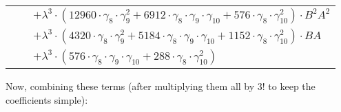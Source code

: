 \documentclass{article}
\begin{document}
\begin{table}[!hp]
\begin{center}
\begin{tabular}{rcl}
 & & $ + {\lambda}^3{\cdot}(12960{\cdot}{\gamma}_{8}{\cdot}{\gamma}_{9}^{2}+6912{\cdot}{\gamma}_{8}{\cdot}{\gamma}_{9}{\cdot}{\gamma}_{10}+576{\cdot}{\gamma}_{8}{\cdot}{\gamma}_{10}^{2}){\cdot}B^{2}A^{2}$ \\
 & & $ + {\lambda}^3{\cdot}(4320{\cdot}{\gamma}_{8}{\cdot}{\gamma}_{9}^{2}+5184{\cdot}{\gamma}_{8}{\cdot}{\gamma}_{9}{\cdot}{\gamma}_{10}+1152{\cdot}{\gamma}_{8}{\cdot}{\gamma}_{10}^{2}){\cdot}BA$ \\
 & & $ + {\lambda}^3{\cdot}(576{\cdot}{\gamma}_{8}{\cdot}{\gamma}_{9}{\cdot}{\gamma}_{10}+288{\cdot}{\gamma}_{8}{\cdot}{\gamma}_{10}^{2})$ \\
\end{tabular}
\end{center}
\end{table}

\newpage

Now, combining these terms (after multiplying them all by $3!$ to keep the coefficients simple):
\end{document}
